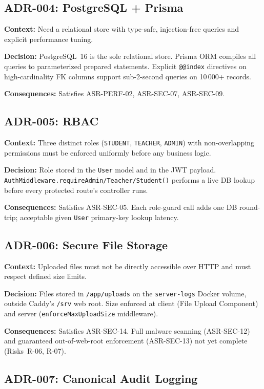 \documentclass[12pt,a4paper]{article}
\begin{document}
\subsection{ADR-004: PostgreSQL + Prisma}

\textbf{Context:} Need a relational store with type-safe, injection-free queries and explicit
performance tuning.

\textbf{Decision:} PostgreSQL~16 is the sole relational store. Prisma ORM compiles all
queries to parameterized prepared statements. Explicit \texttt{@@index} directives on
high-cardinality FK columns support sub-2-second queries on 10\,000+ records.

\textbf{Consequences:} Satisfies ASR-PERF-02, ASR-SEC-07, ASR-SEC-09.

\subsection{ADR-005: RBAC}

\textbf{Context:} Three distinct roles (\texttt{STUDENT}, \texttt{TEACHER}, \texttt{ADMIN})
with non-overlapping permissions must be enforced uniformly before any business logic.

\textbf{Decision:} Role stored in the \texttt{User} model and in the JWT payload.
\texttt{AuthMiddleware.requireAdmin/Teacher/Student()} performs a live DB lookup before
every protected route's controller runs.

\textbf{Consequences:} Satisfies ASR-SEC-05. Each role-guard call adds one DB round-trip;
acceptable given \texttt{User} primary-key lookup latency.

\subsection{ADR-006: Secure File Storage}

\textbf{Context:} Uploaded files must not be directly accessible over HTTP and must respect
defined size limits.

\textbf{Decision:} Files stored in \texttt{/app/uploads} on the \texttt{server-logs}
Docker volume, outside Caddy's \texttt{/srv} web root. Size enforced at client
(File Upload Component) and server (\texttt{enforceMaxUploadSize} middleware).

\textbf{Consequences:} Satisfies ASR-SEC-14. Full malware scanning (ASR-SEC-12) and
guaranteed out-of-web-root enforcement (ASR-SEC-13) not yet complete (Risks~R-06, R-07).

\subsection{ADR-007: Canonical Audit Logging}
\end{document}
